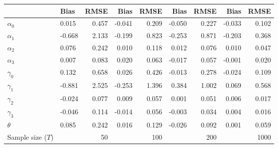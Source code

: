 
\begin{tabular}[t]{llrrrrrrr}
\toprule
  & Bias & RMSE & Bias & RMSE & Bias & RMSE & Bias & RMSE\\
\midrule
$\alpha_{0}$ & 0.015 & 0.457 & -0.041 & 0.209 & -0.050 & 0.227 & -0.033 & 0.102\\
$\alpha_{1}$ & -0.668 & 2.133 & -0.199 & 0.823 & -0.253 & 0.871 & -0.203 & 0.368\\
$\alpha_{2}$ & 0.076 & 0.242 & 0.010 & 0.118 & 0.012 & 0.076 & 0.010 & 0.047\\
$\alpha_{3}$ & 0.007 & 0.083 & 0.020 & 0.063 & -0.017 & 0.057 & -0.001 & 0.020\\
$\gamma_{0}$ & 0.132 & 0.658 & 0.026 & 0.426 & -0.013 & 0.278 & -0.024 & 0.109\\
$\gamma_{1}$ & -0.881 & 2.525 & -0.253 & 1.396 & 0.384 & 1.002 & 0.069 & 0.568\\
$\gamma_{2}$ & -0.024 & 0.077 & 0.009 & 0.057 & 0.001 & 0.051 & 0.006 & 0.017\\
$\gamma_{3}$ & -0.046 & 0.114 & -0.014 & 0.056 & -0.003 & 0.034 & 0.004 & 0.016\\
$\theta$ & 0.085 & 0.242 & 0.016 & 0.129 & -0.026 & 0.092 & 0.001 & 0.059\\
Sample size ($T$) &  & 50 &  & 100 &  & 200 &  & 1000\\
\bottomrule
\end{tabular}
